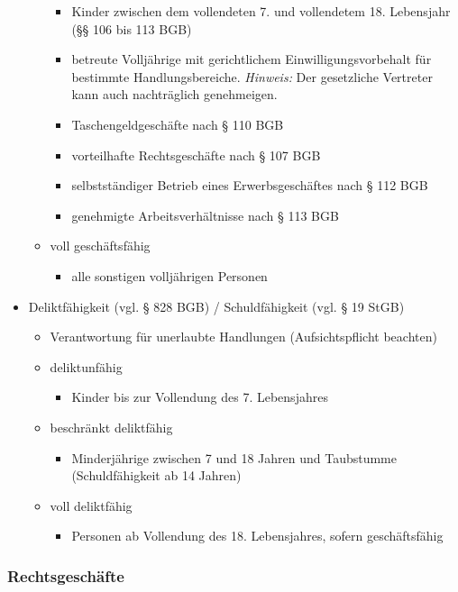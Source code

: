 \begin{itemize}
\begin{itemize}
				\begin{itemize}
					\item Kinder zwischen dem vollendeten 7. und vollendetem 18. Lebensjahr (§§ 106 bis 113 BGB)
					\item betreute Volljährige mit gerichtlichem Einwilligungsvorbehalt für bestimmte Handlungsbereiche. {\it Hinweis:} Der gesetzliche Vertreter kann auch nachträglich genehmeigen.
					\item Taschengeldgeschäfte nach § 110 BGB
					\item vorteilhafte Rechtsgeschäfte nach § 107 BGB
					\item selbstständiger Betrieb eines Erwerbsgeschäftes nach § 112 BGB
					\item genehmigte Arbeitsverhältnisse nach § 113 BGB
				\end{itemize}
			\item voll geschäftsfähig 
				\begin{itemize}
					\item alle sonstigen volljährigen Personen
				\end{itemize}
		\end{itemize}
	\item Deliktfähigkeit (vgl. § 828 BGB) / Schuldfähigkeit (vgl. § 19 StGB)
		\begin{itemize}
			\item Verantwortung für unerlaubte Handlungen (Aufsichtspflicht beachten)
		    \item deliktunfähig
		    	\begin{itemize}
		    		\item Kinder bis zur Vollendung des 7. Lebensjahres
		    	\end{itemize}
		    \item beschränkt deliktfähig
		    	\begin{itemize}
		    		\item Minderjährige zwischen 7 und 18 Jahren und Taubstumme (Schuldfähigkeit ab 14 Jahren)
		     	\end{itemize}
		     \item voll deliktfähig
		     	\begin{itemize}
		     		\item Personen ab Vollendung des 18. Lebensjahres, sofern geschäftsfähig
		     	\end{itemize}
		\end{itemize}
	
\end{itemize}
\subsubsection{Rechtsgeschäfte}


